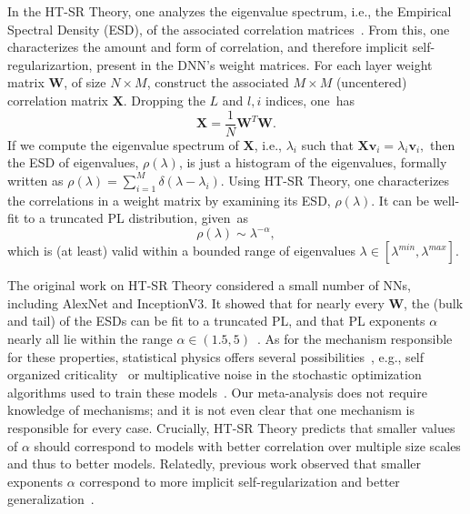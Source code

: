 In the HT-SR Theory, one analyzes the eigenvalue spectrum, i.e., the Empirical Spectral Density (ESD), of the associated correlation matrices~\cite{MM18_TR,MM19_HTSR_ICML,MM20_SDM}.
From this, one characterizes the amount and form of correlation, and therefore implicit self-regularizartion, present in the DNN's weight matrices.
For each layer weight matrix $\mathbf{W}$, of size $N \times M$, construct the associated $M\times M$ (uncentered) correlation matrix $\mathbf{X}$. 
Dropping the $L$ and $l,i$ indices, one~has
$$
\mathbf{X} = \frac{1}{N}\mathbf{W}^{T}\mathbf{W}.
$$
If we compute the eigenvalue spectrum of $\mathbf{X}$, i.e., $\lambda_i$ such that
$  %
\mathbf{X}\mathbf{v}_{i}=\lambda_{i}\mathbf{v}_{i} , 
$  %
then the ESD of eigenvalues, $\rho(\lambda)$, is just a histogram of the eigenvalues, formally written as
$\rho(\lambda)=\sum\nolimits_{i=1}^{M}\delta(\lambda-\lambda_{i})  .$
Using HT-SR Theory, one characterizes the correlations in a weight matrix by examining its ESD, $\rho(\lambda)$.
It can be well-fit to a truncated PL distribution, given~as
\begin{equation}
\rho(\lambda)\sim\lambda^{-\alpha}  ,
\label{eqn:eigenval_pl}
\end{equation}
which is (at least) valid within a bounded range of eigenvalues $\lambda\in[\lambda^{min},\lambda^{max}]$.  

The original work on HT-SR Theory considered a small number of NNs, including AlexNet and InceptionV3. 
It showed that for nearly every $\mathbf{W}$, the (bulk and tail) of the ESDs can be fit to a truncated PL, and that PL exponents $\alpha$ nearly all lie within the range $\alpha\in(1.5,5)$~\cite{MM18_TR,MM19_HTSR_ICML,MM20_SDM}.
%
As for the mechanism responsible for these properties, statistical physics offers several possibilities~\cite{SornetteBook,nishimori01}, e.g., self organized criticality~\cite{SOC87,SOCat25yrs} or multiplicative noise in the stochastic optimization algorithms used to train these models~\cite{HodMah20A_TR,SorCon97}.
Our meta-analysis does not require knowledge of mechanisms; and it is not even clear that one mechanism is responsible for every case.
%
Crucially, HT-SR Theory predicts that smaller values of $\alpha$ should correspond to models with better correlation over multiple size scales and thus to better models.
Relatedly, previous work observed that smaller exponents $\alpha$ correspond to more implicit self-regularization and better generalization~\cite{MM18_TR,MM19_HTSR_ICML,MM20_SDM}.


